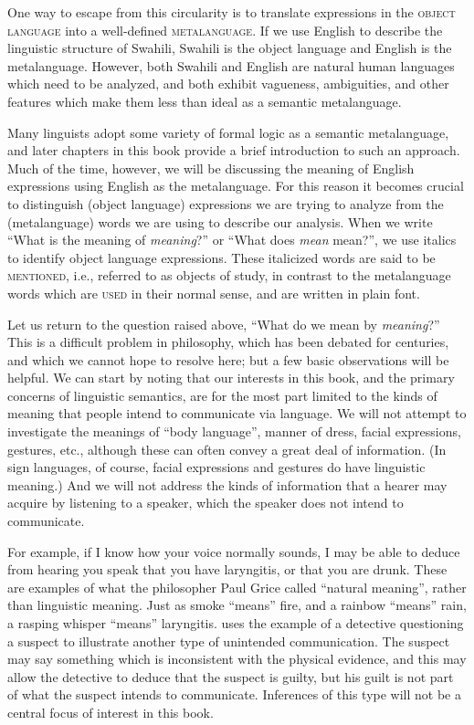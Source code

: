 One way to escape from this circularity is to translate expressions in the \textsc{object language} into a well-defined \textsc{metalanguage}. If we use English to describe the linguistic structure of Swahili, Swahili is the object language and English is the metalanguage. However, both Swahili and English are natural human languages which need to be analyzed, and both exhibit vagueness, ambiguities, and other features which make them less than ideal as a semantic metalanguage.



Many linguists adopt some variety of formal logic as a semantic metalanguage, and later chapters in this book provide a brief introduction to such an approach. Much of the time, however, we will be discussing the meaning of English expressions using English as the metalanguage. For this reason it becomes crucial to distinguish (object language) expressions we are trying to analyze from the (metalanguage) words we are using to describe our analysis. When we write “What is the meaning of \textit{meaning}?” or “What does \textit{mean} mean?”, we use italics to identify object language expressions. These italicized words are said to be \textsc{mentioned}, i.e., referred to as objects of study, in contrast to the metalanguage words which are \textsc{used} in their normal sense, and are written in plain font.



Let us return to the question raised above, “What do we mean by \textit{meaning}?” This is a difficult problem in philosophy, which has been debated for centuries, and which we cannot hope to resolve here; but a few basic observations will be helpful. We can start by noting that our interests in this book, and the primary concerns of linguistic semantics, are for the most part limited to the kinds of meaning that people intend to communicate via language. We will not attempt to investigate the meanings of “body language”, manner of dress, facial expressions, gestures, etc., although these can often convey a great deal of information. (In sign languages, of course, facial expressions and gestures do have linguistic meaning.) And we will not address the kinds of information that a hearer may acquire by listening to a speaker, which the speaker does not intend to communicate.



For example, if I know how your voice normally sounds, I may be able to deduce from hearing you speak that you have laryngitis, or that you are drunk. These are examples of what the philosopher Paul Grice called “natural meaning”, rather than linguistic meaning. Just as smoke “means” fire, and a rainbow “means” rain, a rasping whisper “means” laryngitis. \citet[15]{Levinson1983} uses the example of a detective questioning a suspect to illustrate another type of unintended communication. The suspect may say something which is inconsistent with the physical evidence, and this may allow the detective to deduce that the suspect is guilty, but his guilt is not part of what the suspect intends to communicate. Inferences of this type will not be a central focus of interest in this book.



